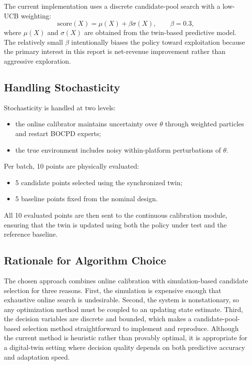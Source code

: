 \documentclass[11pt]{article}
\begin{document}
The current implementation uses a discrete candidate-pool search with a low-UCB weighting:
\[
\text{score}(X)=\mu(X)+\beta \sigma(X), \qquad \beta=0.3,
\]
where $\mu(X)$ and $\sigma(X)$ are obtained from the twin-based predictive model. The relatively small $\beta$ intentionally biases the policy toward exploitation because the primary interest in this report is net-revenue improvement rather than aggressive exploration.

\subsection{Handling Stochasticity}
Stochasticity is handled at two levels:
\begin{itemize}[leftmargin=1.5em]
    \item the online calibrator maintains uncertainty over $\theta$ through weighted particles and restart BOCPD experts;
    \item the true environment includes noisy within-platform perturbations of $\theta$.
\end{itemize}

Per batch, 10 points are physically evaluated:
\begin{itemize}[leftmargin=1.5em]
    \item 5 candidate points selected using the synchronized twin;
    \item 5 baseline points fixed from the nominal design.
\end{itemize}

All 10 evaluated points are then sent to the continuous calibration module, ensuring that the twin is updated using both the policy under test and the reference baseline.

\subsection{Rationale for Algorithm Choice}
The chosen approach combines online calibration with simulation-based candidate selection for three reasons. First, the simulation is expensive enough that exhaustive online search is undesirable. Second, the system is nonstationary, so any optimization method must be coupled to an updating state estimate. Third, the decision variables are discrete and bounded, which makes a candidate-pool-based selection method straightforward to implement and reproduce. Although the current method is heuristic rather than provably optimal, it is appropriate for a digital-twin setting where decision quality depends on both predictive accuracy and adaptation speed.
\end{document}
